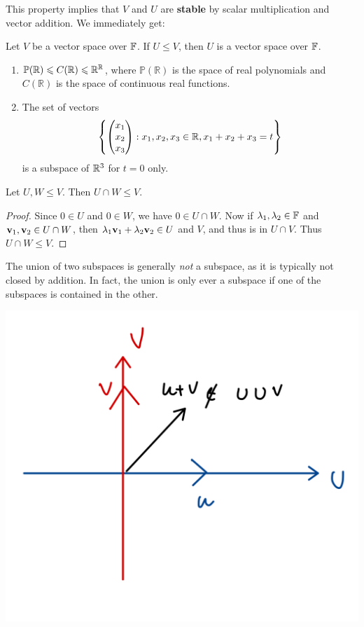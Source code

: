 \documentclass[a4paper,11pt]{article}
\begin{document}
This property implies that $V$ and $U$ are \textbf{stable} by scalar multiplication and vector addition. We immediately get:
\begin{proposition}
    Let $ V $ be a vector space over ${\mathbb{F}}$. If $ U\le V $, then $U$ is a vector space over ${\mathbb{F}}$.
\end{proposition}
\begin{example}
    \begin{enumerate}
        \item $ \mathbb{P}({\mathbb{R}})\leqslant C({\mathbb{R}})\leqslant \mathbb{R} ^\mathbb{R}  $, where $ \mathbb{P}(\mathbb{R}) $ is the space of real polynomials and $ C(\mathbb{R}) $ is the space of continuous real functions.
        \item The set of vectors
        $$
        \left\{\begin{pmatrix}x_1 \\ x_2 \\ x_3\end{pmatrix} : x_1, x_2, x_3 \in {\mathbb{R}}, x_1 + x_2 + x_3 = t\right\}
        $$
        is a subspace of ${\mathbb{R}}^3$ for $t = 0$ only.
    \end{enumerate}
\end{example}
\begin{proposition}
    Let $U, W \le V$. Then $U \cap W \le V$.
\end{proposition}
\begin{proof}
    Since $0 \in U$ and $0 \in W$, we have $0 \in U \cap W$. Now if $\lambda_1, \lambda_2 \in {\mathbb{F}}$ and ${\bf v}_1, {\bf v}_2 \in U \cap W$, then $\lambda_1 {\bf v}_1 + \lambda_2 {\bf v}_2 \in U$ and $V$, and thus is in $U \cap V$. Thus $U \cap W \le V$.
\end{proof}
The union of two subspaces is generally \emph{not} a subspace, as it is typically not closed by addition. In fact, the union is only ever a subspace if one of the subspaces is contained in the other. 
\begin{center}
    \includegraphics[scale=0.13]{la1.jpeg}
\end{center}
\end{document}

